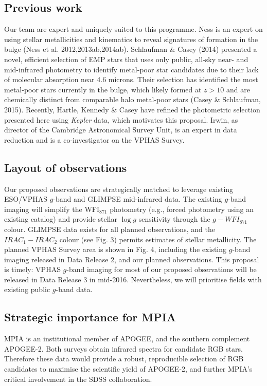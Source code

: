 \documentclass[a4paper]{article}
\begin{document}
\begin{ObservingProgram}
\subsection*{Previous work}
Our team are expert and uniquely suited to this programme.  Ness is an expert on using stellar metallicities and kinematics to reveal signatures of formation in the bulge (Ness et al. 2012,2013ab,2014ab).  Schlaufman \& Casey (2014) presented a novel, efficient selection of EMP stars that uses only public, all-sky near- and mid-infrared photometry to identify metal-poor star candidates due to their lack of molecular absorption near 4.6 microns. Their selection has identified the most metal-poor stars currently in the bulge, which likely formed at $z > 10$ and are chemically distinct from comparable halo metal-poor stars (Casey \& Schlaufman, 2015). Recently, Hartle, Kennedy \& Casey have refined the photometric selection presented here using \textit{Kepler} data, which motivates this proposal. Irwin, as director of the Cambridge Astronomical Survey Unit, is an expert in data reduction and is a co-investigator on the VPHAS Survey.


\subsection*{Layout of observations}
Our proposed observations are strategically matched to leverage existing ESO/VPHAS $g$-band and GLIMPSE mid-infrared data. The existing $g$-band imaging will simplify the WFI$_{871}$ photometry (e.g., forced photometry using an existing catalog) and provide stellar $\log{g}$ sensitivity through the $g-WFI_{871}$ colour. GLIMPSE data exists for all planned observations, and the $IRAC_{1} - IRAC_{2}$ colour (see Fig. 3) permits estimates of stellar metallicity.  The planned VPHAS Survey area is shown in Fig. 4, including the existing $g$-band imaging released in Data Release 2, and our planned observations. This proposal is timely: VPHAS $g$-band imaging for most of our proposed observations will be released in Data Release 3 in mid-2016. Nevertheless, we will prioritise fields with existing public $g$-band data.


\subsection*{Strategic importance for MPIA}
MPIA is an institutional member of APOGEE, and the southern complement APOGEE-2. Both surveys obtain infrared spectra for candidate RGB stars. Therefore these data would provide a robust, reproducible selection of RGB candidates to maximise the scientific yield of APOGEE-2, and further MPIA's critical involvement in the SDSS collaboration. 


\end{ObservingProgram}
\end{document}
